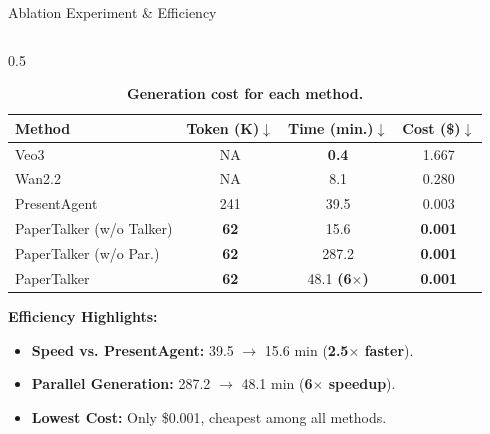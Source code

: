 \documentclass{beamer}
\newcommand{\alertterm}[1]{\alert{\textbf{#1}}}
\begin{document}
\begin{frame}{Ablation Experiment \& Efficiency}
  \begin{columns}[T] %
    \begin{column}{0.5\textwidth}
      \begin{table} %
        \centering
        \small
        \setlength{\tabcolsep}{3pt}
        \caption{\textbf{Generation cost for each method.}}
        \label{table:cost_exp}
        \begin{tabular}{lccc}
          \toprule
          Method & Token (K)$\downarrow$ & Time (min.)$\downarrow$ & Cost (\$)$\downarrow$ \\
          \midrule
          Veo3~\cite{deepmind2025veo3} & NA & \textbf{0.4} & 1.667 \\
          Wan2.2~\cite{wan} & NA & 8.1 & 0.280 \\
          \midrule
          PresentAgent~\cite{shi2025presentagent} & 241 & 39.5 & 0.003  \\
          PaperTalker (w/o Talker) & \textbf{62} & 15.6 & \textbf{0.001}\\
          \midrule
          PaperTalker (w/o Par.) & \textbf{62} & 287.2 & \textbf{0.001}\\
          PaperTalker & \textbf{62} & 48.1 \textbf{(\alertterm{6$\times$})} & \textbf{0.001} \\
          \bottomrule
        \end{tabular}
      \end{table}
      \vspace{-0.3\baselineskip}
      \textbf{Efficiency Highlights:}
      \begin{itemize}
        \item \textbf{Speed vs. PresentAgent:} 39.5 $\rightarrow$ 15.6 min (\alertterm{2.5$\times$ faster}).
        \item \textbf{Parallel Generation:} 287.2 $\rightarrow$ 48.1 min (\alertterm{6$\times$ speedup}).
        \item \textbf{Lowest Cost:} Only \$0.001, cheapest among all methods.
      \end{itemize}
    \end{column}


\end{columns}
\end{frame}
\end{document}
